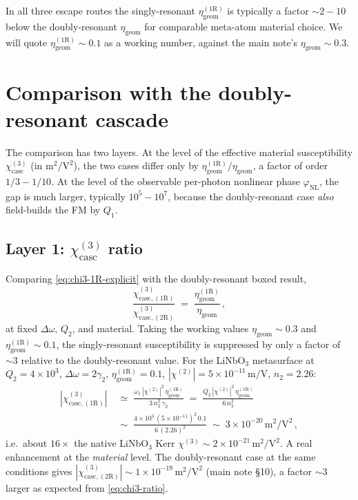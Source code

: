 \documentclass[11pt,a4paper]{article}
\newcommand{\chitwo}{\chi^{(2)}}
\newcommand{\chithree}{\chi^{(3)}}
\newcommand{\Dom}{\Delta\omega}
\newcommand{\chicascOneR}{\chi^{(3)}_{\text{casc},(1\mathrm R)}}
\newcommand{\chicascTwoR}{\chi^{(3)}_{\text{casc},(2\mathrm R)}}
\begin{document}
In all three escape routes the singly-resonant
$\eta_\text{geom}^{(1\mathrm R)}$ is typically a factor $\sim 2\!-\!10$
below the doubly-resonant $\eta_\text{geom}$ for comparable meta-atom
material choice.  We will quote $\eta_\text{geom}^{(1\mathrm R)}\sim 0.1$
as a working number, against the main note's
$\eta_\text{geom}\sim 0.3$.

\section{Comparison with the doubly-resonant cascade}\label{sec:compare}

The comparison has two layers.  At the level of the effective material
susceptibility $\chithree_\text{casc}$ (in $\mathrm{m}^{2}/\mathrm{V}^{2}$),
the two cases differ only by $\eta_\text{geom}^{(1\mathrm R)}/\eta_\text{geom}$,
a factor of order $1/3\!-\!1/10$.  At the level of the observable
per-photon nonlinear phase $\varphi_\text{NL}$, the gap is much larger,
typically $10^{5}\!-\!10^{7}$, because the doubly-resonant case
\emph{also} field-builds the FM by $Q_1$.

\subsection*{Layer 1: \texorpdfstring{$\chithree_\text{casc}$}{χ³\_casc} ratio}

Comparing \eqref{eq:chi3-1R-explicit} with the doubly-resonant boxed result,
\begin{equation}
  \frac{\chicascOneR}{\chicascTwoR}
   \;=\;\frac{\eta_\text{geom}^{(1\mathrm R)}}{\eta_\text{geom}}\,,
  \label{eq:chi3-ratio}
\end{equation}
at fixed $\Dom$, $Q_2$, and material.  Taking the working values
$\eta_\text{geom}\sim 0.3$ and $\eta_\text{geom}^{(1\mathrm R)}\sim 0.1$,
the singly-resonant susceptibility is suppressed by only a factor of
$\sim 3$ relative to the doubly-resonant value.  For the LiNbO$_3$
metasurface at $Q_2=4\!\times\!10^{3}$, $\Dom=2\gamma_2$,
$\eta_\text{geom}^{(1\mathrm R)}=0.1$, $|\chitwo|=5\!\times\!10^{-11}\,
\mathrm{m/V}$, $n_2=2.26$:
\begin{align}
  |\chicascOneR|
   &\;\simeq\;\frac{\omega_1\,|\chitwo|^{2}\,\eta_\text{geom}^{(1\mathrm R)}}
                  {3\,n_2^{2}\,\gamma_2}
   \;=\;\frac{Q_2\,|\chitwo|^{2}\,\eta_\text{geom}^{(1\mathrm R)}}{6\,n_2^{2}}\nonumber\\[2pt]
   &\;\sim\;\frac{4\times 10^{3}\,(5\!\times\!10^{-11})^{2}\,0.1}
                  {6\,(2.26)^{2}}
   \;\sim\;3\times 10^{-20}\,\mathrm{m^{2}/V^{2}}\,,
\end{align}
i.e.\ about $16\times$ the native LiNbO$_3$ Kerr $\chithree\sim
2\times 10^{-21}\,\mathrm{m^{2}/V^{2}}$.  A real enhancement at the
\emph{material} level.  The doubly-resonant case at the same conditions
gives $|\chicascTwoR|\sim 1\!\times\!10^{-19}\,
\mathrm{m^{2}/V^{2}}$ (main note \S 10), a factor $\sim 3$ larger as
expected from \eqref{eq:chi3-ratio}.
\end{document}
